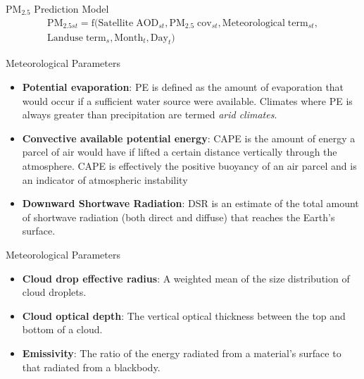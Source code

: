 \documentclass{beamer}
\begin{document}
\begin{frame}{PM$_{2.5}$ Prediction Model}
    \begin{align*}
        \mathrm{PM_{2.5\mathit{st}}=f(Satellite\;AOD_{\mathit{st}},PM_{2.5}\;cov_{\mathit{st}},Meteorological\;term_{\mathit{st}}, } \\
        \mathrm{Landuse\;term_\mathit{s},Month_\mathit{t}, Day_\mathit{t})}
    \end{align*}
\end{frame}

\begin{frame}{Meteorological Parameters}
     \begin{itemize}
            \item \textbf{Potential evaporation}: PE is defined as the amount of evaporation that would occur if a sufficient water source were available. Climates where PE is always greater than precipitation are termed \textit{arid climates}.
            \item \textbf{Convective available potential energy}: CAPE is the amount of energy a parcel of air would have if lifted a certain distance vertically through the atmosphere. CAPE is effectively the positive buoyancy of an air parcel and is an indicator of atmospheric instability
            \item \textbf{Downward Shortwave Radiation}: DSR is an estimate of the total amount of shortwave radiation (both direct and diffuse) that reaches the Earth’s surface.
        \end{itemize}
\end{frame}

\begin{frame}{Meteorological Parameters}
     \begin{itemize}
            \item \textbf{Cloud drop effective radius}: A weighted mean of the size distribution of cloud droplets.
            \item \textbf{Cloud optical depth}: The vertical optical thickness between the top and bottom of a cloud.
            \item \textbf{Emissivity}: The ratio of the energy radiated from a material's surface to that radiated from a blackbody.
        \end{itemize}
\end{frame}
\end{document}
